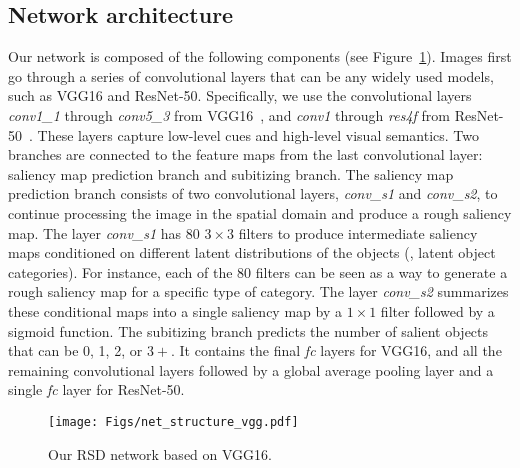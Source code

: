 \documentclass[10pt,twocolumn,letterpaper]{article}
\begin{document}

\subsection{Network architecture}

Our network is composed of the following components (see Figure~\ref{fig:network}). Images first go through a series of convolutional layers that can be any widely used models, such as VGG16 and ResNet-50. Specifically, we use the convolutional layers \emph{conv1\_1} through \emph{conv5\_3} from VGG16~\cite{DBLP:journals/corr/SimonyanZ14a}, and \emph{conv1} through \emph{res4f} from ResNet-50~\cite{DBLP:journals/corr/HeZRS15}. 
These layers capture low-level cues and high-level visual semantics.
Two branches are connected to the feature maps from the last convolutional layer: saliency map prediction branch and subitizing branch. 
The saliency map prediction branch consists of two convolutional layers, \emph{conv\_s1} and \emph{conv\_s2}, to continue processing the image in the spatial domain and produce a rough saliency map. 
The layer \emph{conv\_s1} has 80 $3\times3$ filters to produce intermediate saliency maps conditioned on different latent distributions of the objects (\eg, latent object categories). For instance, each of the 80 filters can be seen as a way to generate a rough saliency map for a specific type of category.
The layer \emph{conv\_s2} summarizes these conditional maps into a single saliency map by a $1\times1$ filter followed by a sigmoid function.  
The subitizing branch predicts the number of salient objects that can be 0, 1, 2, or $3+$. It contains the final \emph{fc} layers for VGG16, and all the remaining convolutional layers followed by a global average pooling layer and a single \emph{fc} layer for ResNet-50.

\begin{figure}[t]
\centering
\texttt{[image: Figs/net\_structure\_vgg.pdf]}
\caption{Our RSD network based on VGG16.}
\label{fig:network}
\end{figure}
\end{document}
